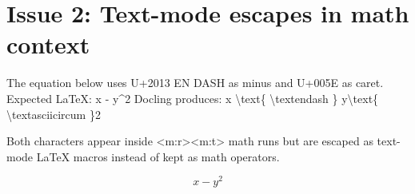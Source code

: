 \documentclass[11pt,a4paper]{article}
\begin{document}
\section{Issue 2: Text-mode escapes in math context}

The equation below uses U+2013 EN DASH as minus and U+005E as caret.
Expected LaTeX: x - y\textasciicircum{}2
Docling produces: x \textbackslash{}text\{ \textbackslash{}textendash \} y\textbackslash{}text\{ \textbackslash{}textasciicircum \}2

Both characters appear inside <m:r><m:t> math runs but are escaped as text-mode LaTeX macros instead of kept as math operators.

$$x - y^2$$
\end{document}
